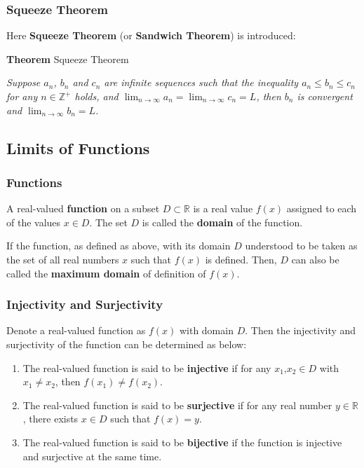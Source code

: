 \documentclass[a4paper,12pt]{article}
\newcommand{\n}{\vspace{3mm}}
\newcommand{\R}{\mathbb{R}}
\newcommand{\Z}{\mathbb{Z}}
\newenvironment{block}[4][Block]{ %
\begin{list}{}{
  \setlength{\leftmargin}{0mm}
  \setlength{\rightmargin}{0mm}
  \setlength{\topsep}{0mm}
  \setlength{\partopsep}{0mm}
  \parsep\parskip
  \setlength{\itemsep}{-\parsep}
  }
  \needspace{\baselineskip}
  \item \textbf{#2 #3} \hspace{1mm} #4
  \vspace{1mm}
  \item
  }
{
\end{list}
}
\newenvironment{alist}{ %
\begin{enumerate}[label=(\alph*)]
}{
\end{enumerate}
}
\begin{document}
\subsubsection{Squeeze Theorem}
Here \textbf{Squeeze Theorem} (or \textbf{Sandwich Theorem}) is introduced:\n

\begin{block}{Theorem}{}{Squeeze Theorem}
  \textit{Suppose $a_{n}$, $b_{n}$ and $c_{n}$ are infinite sequences such that the inequality $a_{n}\leq b_{n}\leq c_{n}$ for any $n\in \Z^{+}$ holds, and $\lim_{n\to \infty}a_{n}=\lim_{n\to \infty}c_{n}=L$, then $b_{n}$ is convergent and $\lim_{n\to \infty}b_{n}=L$.}
\end{block}

\subsection{Limits of Functions}
\subsubsection{Functions}
A real-valued \textbf{function} on a subset $D\subset \R$ is a real value $f(x)$ assigned to each of the values $x\in D$. The set $D$ is called the \textbf{domain} of the function.\n

If the function, as defined as above, with its domain $D$ understood to be taken as the set of all real numbers $x$ such that $f(x)$ is defined. Then, $D$ can also be called the \textbf{maximum domain} of definition of $f(x)$.

\subsubsection{Injectivity and Surjectivity}
Denote a real-valued function as $f(x)$ with domain $D$. Then the injectivity and surjectivity of the function can be determined as below:
\begin{alist}
  \item The real-valued function is said to be \textbf{injective} if for any $x_{1}\text{,}x_{2}\in D$ with $x_{1}\neq x_{2}$, then $f(x_{1})\neq f(x_{2})$.
  \item The real-valued function is said to be \textbf{surjective} if for any real number $y\in \R$, there exists $x\in D$ such that $f(x)=y$.
  \item The real-valued function is said to be \textbf{bijective} if the function is injective and surjective at the same time.
\end{alist}
\end{document}
